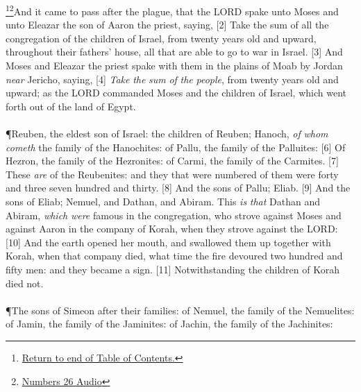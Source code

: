 \footnote{\textcolor[rgb]{0.00,0.25,0.00}{\hyperlink{TOC}{Return to end of Table of Contents.}}}\footnote{\href{https://audiobible.com/bible/numbers_26.html}{\textcolor[cmyk]{0.99998,1,0,0}{Numbers 26 Audio}}}\textcolor[cmyk]{0.99998,1,0,0}{And it came to pass after the plague, that the LORD spake unto Moses and unto Eleazar the son of Aaron the priest, saying,}
[2] \textcolor[cmyk]{0.99998,1,0,0}{Take the sum of all the congregation of the children of Israel, from twenty years old and upward, throughout their fathers' house, all that are able to go to war in Israel.}
[3] \textcolor[cmyk]{0.99998,1,0,0}{And Moses and Eleazar the priest spake with them in the plains of Moab by Jordan \emph{near} Jericho, saying,}
[4] \textcolor[cmyk]{0.99998,1,0,0}{\emph{Take} \emph{the} \emph{sum} \emph{of} \emph{the} \emph{people}, from twenty years old and upward; as the LORD commanded Moses and the children of Israel, which went forth out of the land of Egypt.}\\
\\
\P \textcolor[cmyk]{0.99998,1,0,0}{Reuben, the eldest son of Israel: the children of Reuben; Hanoch, \emph{of} \emph{whom} \emph{cometh} the family of the Hanochites: of Pallu, the family of the Palluites:}
[6] \textcolor[cmyk]{0.99998,1,0,0}{Of Hezron, the family of the Hezronites: of Carmi, the family of the Carmites.}
[7] \textcolor[cmyk]{0.99998,1,0,0}{These \emph{are}  of the Reubenites: and they that were numbered of them were forty and three  seven hundred and thirty.}
[8] \textcolor[cmyk]{0.99998,1,0,0}{And the sons of Pallu; Eliab.}
[9] \textcolor[cmyk]{0.99998,1,0,0}{And the sons of Eliab; Nemuel, and Dathan, and Abiram. This \emph{is} \emph{that} Dathan and Abiram, \emph{which} \emph{were} famous in the congregation, who strove against Moses and against Aaron in the company of Korah, when they strove against the LORD:}
[10] \textcolor[cmyk]{0.99998,1,0,0}{And the earth opened her mouth, and swallowed them up together with Korah, when that company died, what time the fire devoured two hundred and fifty men: and they became a sign.}
[11] \textcolor[cmyk]{0.99998,1,0,0}{Notwithstanding the children of Korah died not.}\\
\\
\P \textcolor[cmyk]{0.99998,1,0,0}{The sons of Simeon after their families: of Nemuel, the family of the Nemuelites: of Jamin, the family of the Jaminites: of Jachin, the family of the Jachinites:}
